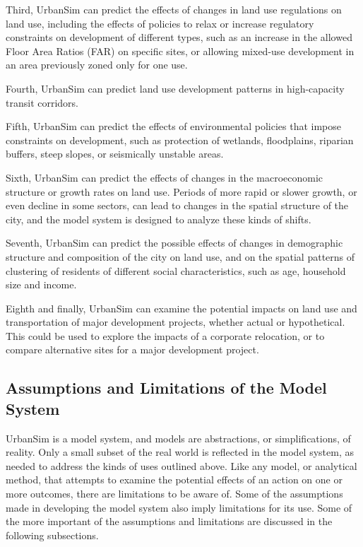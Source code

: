 Third, UrbanSim can predict the effects of changes in land use regulations on land use, including the effects of policies to relax or increase regulatory constraints on development of different types, such as an increase in the allowed Floor Area Ratios (FAR) on specific sites, or allowing mixed-use development in an area previously zoned only for one use.

Fourth, UrbanSim can predict land use development patterns in high-capacity transit corridors.

Fifth, UrbanSim can predict the effects of environmental policies that impose constraints on development, such as protection of wetlands, floodplains, riparian buffers, steep slopes, or seismically unstable areas.

Sixth, UrbanSim can predict the effects of changes in the macroeconomic structure or growth rates on land use. Periods of more rapid or slower growth, or even decline in some sectors, can lead to changes in the spatial structure of the city, and the model system is designed to analyze these kinds of shifts.

Seventh, UrbanSim can predict the possible effects of changes in demographic structure and composition of the city on land use, and on the spatial patterns of clustering of residents of different social characteristics, such as age, household size and income.

Eighth and finally, UrbanSim can examine the potential impacts on land use and transportation of major development projects, whether actual or hypothetical. This could be used to explore the impacts of a corporate relocation, or to compare alternative sites for a major development project.


\subsection{Assumptions and Limitations of the Model System}

UrbanSim is a model system, and models are abstractions, or simplifications, of reality. Only a small subset of the real world is reflected in the model system, as needed to address the kinds of uses outlined above. Like any model, or analytical method, that attempts to examine the potential effects of an action on one or more outcomes, there are limitations to be aware of. Some of the assumptions made in developing the model system also imply limitations for its use. Some of the more
important of the assumptions and limitations are discussed in the following subsections.

